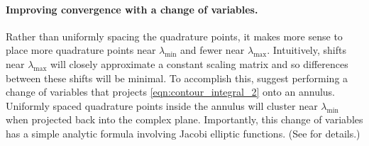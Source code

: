 \paragraph{Improving convergence with a change of variables.}
Rather than uniformly spacing the quadrature points, it makes more sense to place more quadrature points near $\lambda_\text{min}$ and fewer near $\lambda_\text{max}$.
Intuitively, shifts near $\lambda_\text{max}$ will closely approximate a constant scaling matrix and so differences between these shifts will be minimal.
To accomplish this, \cite{hale2008computing} suggest performing a change of variables that projects \cref{eqn:contour_integral_2} onto an annulus.
Uniformly spaced quadrature points inside the annulus will cluster near $\lambda_\text{min}$ when projected back into the complex plane.
Importantly, this change of variables has a simple analytic formula involving Jacobi elliptic functions.
(See \citep[][Sec. 2]{hale2008computing} for details.)

